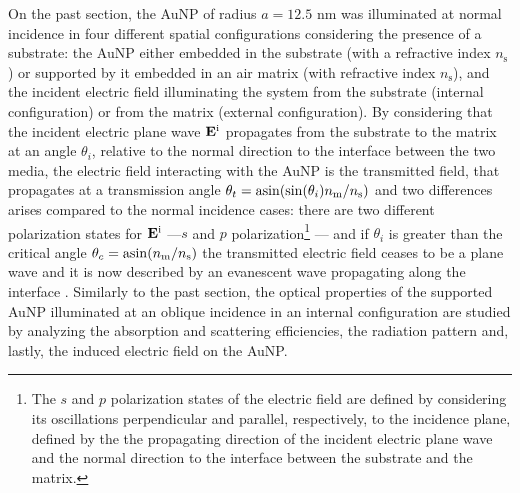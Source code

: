 
On the past section, the AuNP of radius $a = 12.5$ nm was illuminated at normal incidence in four different spatial configurations considering the  presence of a substrate: the AuNP either embedded in the substrate (with a refractive index $n_\text{s}$) or supported by it embedded in an air matrix (with refractive index $n_\text{s}$), and the incident electric field  illuminating the system from the substrate (internal configuration) or from the matrix (external configuration). By considering that the incident electric plane wave $\vb{E}^\text{i}$  propagates from the substrate to the matrix at an angle $\theta_i$, relative to the normal direction to the interface between the two media, the electric field interacting with the AuNP is the transmitted field, that propagates at a transmission angle $\theta_t = \asin(\sin(\theta_i) n_\text{m}/n_\text{s})$ \cite{born_max_principle_1999} and two differences arises compared to the normal incidence cases: there are two different polarization states for $\vb{E}^\text{i}$ ---$s$ and $p$ polarization\footnote{%
    The $s$ and $p$ polarization states of the electric field are defined by considering its oscillations perpendicular and parallel, respectively, to the incidence plane, defined by the the propagating direction of the incident electric plane wave and the normal direction to the interface between the substrate and the matrix.}%
--- and if $\theta_i$ is greater than the critical angle $\theta_c = \asin(n_\text{m}/n_\text{s})$ the transmitted electric field ceases to be a plane wave and it is now described by an evanescent wave propagating along the interface  \cite{born_max_principle_1999}. Similarly to the past section, the optical properties of the supported AuNP illuminated at an oblique incidence in an internal configuration are studied by analyzing the absorption and scattering efficiencies, the radiation pattern and, lastly, the induced electric field on the AuNP.

